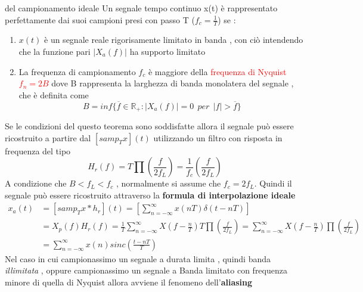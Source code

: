 \documentclass{article}
\theoremstyle{definition}
\newcommand{\R}{\mathbb{R}}
\newcommand{\suminf}{\sum_{n=-\infty}^{\infty}}
\begin{document}
	\begin{teo*}{del campionamento ideale}
	Un segnale tempo continuo x(t) è rappresentato perfettamente dai suoi campioni presi con passo T ($f_c=\frac{1}{T}$) se : 
	\begin{enumerate}
	\item $x(t)$ è un segnale reale rigorisamente limitato in banda , con ciò intendendo che la funzione pari $|X_a(f)|$ ha supporto limitato
	\item La frequenza di campionamento $f_c$ è maggiore della \textcolor{red}{frequenza di Nyquist $f_n=2B$} dove B rappresenta la larghezza di banda monolatera del segnale , che è definita come $$B=inf\{\overline{f}\in \R_+: |X_a(f)|=0 \ \ per \ \ |f|>\overline{f}\}$$
	\end{enumerate}
	\end{teo*}
	Se le condizioni del questo teorema sono soddisfatte allora il segnale può essere ricostruito  a partire dal $[samp_Tx](t)$ utilizzando un filtro con risposta in frequenza del tipo 
	$$H_r(f)=T \prod \left(\frac{f}{2 f_L}\right)=\frac{1}{f_c}\left(\frac{f}{2 f_L}\right) $$
	A condizione che $B < f_L < f_c$ , normalmente si assume che $f_c=2f_L$.
	Quindi il segnale può essere ricostruito attraverso la \textbf{formula di interpolazione ideale} 
	\begin{align*}
		x_a(t)&=[samp_Tx * h_r](t)= \left[\suminf x(nT)\delta(t-nT)\right]\\
		&=X_p(f )H_r(f) = \frac{1}{T} \suminf X(f-\frac{n}{T}) T \prod \left(\frac{f}{2 f_L}\right) = \suminf X(f-\frac{n}{T})  \prod \left(\frac{f}{2 f_L}\right) \\
		&= \suminf x(n)sinc \left(\frac{t-nT}{T}\right)
	\end{align*}
	Nel caso in cui campionassimo un segnale a durata limita , quindi banda \textit{illimitata} , oppure campionassimo un segnale a Banda limitato con frequenza minore di quella di Nyquist allora avviene il fenomeno dell'\textbf{aliasing}
	\newpage
\end{document}
